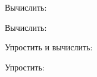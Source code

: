 \begin{listofex}
	\item Вычислить:
	\begin{enumcols}[itemcolumns=2]
		\item {}
		\item {}
	\end{enumcols}
	\item Вычислить:
	\begin{enumcols}[itemcolumns=2]
		\item {}
		\item {}
		\item {}
		\item {}
		\item {}
	\end{enumcols}
	\item {}
	\item Упростить и вычислить:
	\begin{enumcols}[itemcolumns=2]
		\item {}
		\item {}
		\item {}
	\end{enumcols}
	\item Упростить:
	\begin{enumcols}[itemcolumns=2]
		\item {}
		\item {}
	\end{enumcols}
	\item {}
	\item {}
	\item {}
\end{listofex}